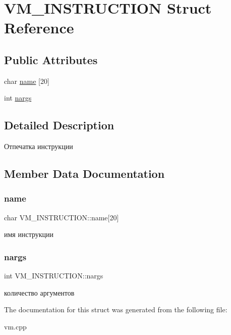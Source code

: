 \hypertarget{struct_v_m___i_n_s_t_r_u_c_t_i_o_n}{}\section{V\+M\+\_\+\+I\+N\+S\+T\+R\+U\+C\+T\+I\+ON Struct Reference}
\label{struct_v_m___i_n_s_t_r_u_c_t_i_o_n}
\subsection*{Public Attributes}
\begin{DoxyCompactItemize}
\item 
char \hyperlink{struct_v_m___i_n_s_t_r_u_c_t_i_o_n_afe504e955a0d0a4494c1ffbd4dc42a2d}{name} \mbox{[}20\mbox{]}
\item 
int \hyperlink{struct_v_m___i_n_s_t_r_u_c_t_i_o_n_a4d4cf909e9288d25c75b7ce1eae49e17}{nargs}
\end{DoxyCompactItemize}


\subsection{Detailed Description}
Отпечатка инструкции 

\subsection{Member Data Documentation}
\mbox{\label{struct_v_m___i_n_s_t_r_u_c_t_i_o_n_afe504e955a0d0a4494c1ffbd4dc42a2d}} 
\subsubsection{\texorpdfstring{name}{name}}
{\footnotesize\ttfamily char V\+M\+\_\+\+I\+N\+S\+T\+R\+U\+C\+T\+I\+O\+N\+::name\mbox{[}20\mbox{]}}

имя инструкции \mbox{\label{struct_v_m___i_n_s_t_r_u_c_t_i_o_n_a4d4cf909e9288d25c75b7ce1eae49e17}} 
\subsubsection{\texorpdfstring{nargs}{nargs}}
{\footnotesize\ttfamily int V\+M\+\_\+\+I\+N\+S\+T\+R\+U\+C\+T\+I\+O\+N\+::nargs}

количество аргументов 

The documentation for this struct was generated from the following file\+:\begin{DoxyCompactItemize}
\item 
vm.\+cpp\end{DoxyCompactItemize}
